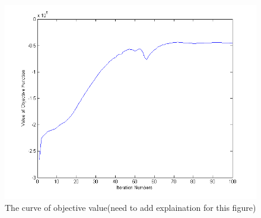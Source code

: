 \begin{figure}[htb]
	\centering
	\includegraphics[width=\linewidth]{images/Initialization/obj_iter.png}
	\caption{\label{fig:iter_curve}The curve of objective value(need to add explaination for this figure)}
\end{figure}
%
%
